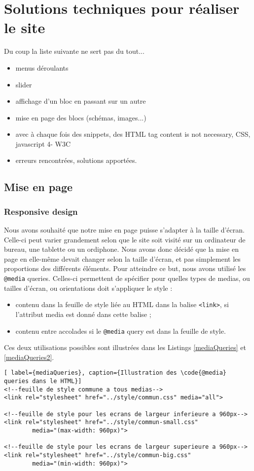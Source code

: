 \documentclass{scrartcl}
\newcommand{\code}[1]{\texttt{#1}}
\begin{document}
\section{Solutions techniques pour réaliser le site}

Du coup la liste suivante ne sert pas du tout...
\begin{itemize}
\item menus déroulants
\item slider
\item affichage d’un bloc en passant sur un autre
\item mise en page des blocs (schémas, images...)
\item avec à chaque fois des snippets, des HTML tag content is not necessary, CSS, javascript 4- W3C
\item erreurs rencontrées, solutions apportées. 

\end{itemize}


\subsection{Mise en page}
\subsubsection{Responsive design}
Nous avons souhaité que notre mise en page puisse s'adapter à la taille d'écran. Celle-ci peut varier grandement selon que le site soit visité sur un ordinateur de bureau, une tablette ou un ordiphone. Nous avons donc décidé que la mise en page en elle-même devait changer selon la taille d'écran, et pas simplement les proportions des différents éléments. Pour atteindre ce but, nous avons utilisé les \code{@media} queries. Celles-ci permettent de spécifier pour quelles types de medias, ou tailles d'écran, ou orientations doit s'appliquer le style :
\begin{itemize}
\item contenu dans la feuille de style liée au HTML dans la balise \code{<link>}, si l'attribut media est donné dans cette balise ;
\item contenu entre accolades si le \code{@media} query est dans la feuille de style.
\end{itemize}
Ces deux utilisations possibles sont illustrées dans les Listings \ref{mediaQueries} et \ref{mediaQueries2}.

\begin{lstlisting}[ label={mediaQueries}, caption={Illustration des \code{@media} queries dans le HTML}]
<!--feuille de style commune a tous medias-->
<link rel="stylesheet" href="../style/commun.css" media="all">

<!--feuille de style pour les ecrans de largeur inferieure a 960px-->
<link rel="stylesheet" href="../style/commun-small.css" 
        media="(max-width: 960px)">

<!--feuille de style pour les ecrans de largeur superieure a 960px-->
<link rel="stylesheet" href="../style/commun-big.css" 
        media="(min-width: 960px)">

\end{lstlisting}
\end{document}
